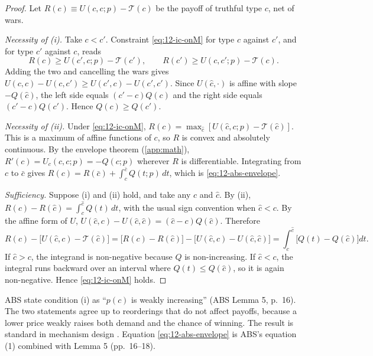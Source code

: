 \begin{proof}
Let $R(c) \equiv U(c, c; p) - \mathcal T(c)$ be the payoff of truthful type $c$, net of wars.

\emph{Necessity of (i).} Take $c < c'$. Constraint \eqref{eq:12-ic-onM} for type $c$ against $c'$, and for type $c'$
against $c$, reads
\begin{equation*}
R(c) \ge U(c', c; p) - \mathcal T(c'),
\qquad
R(c') \ge U(c, c'; p) - \mathcal T(c).
\end{equation*}
Adding the two and cancelling the wars gives $U(c, c) - U(c, c') \ge U(c', c) - U(c', c')$. Since $U(\hat c, \cdot)$ is
affine with slope $-Q(\hat c)$, the left side equals $(c' - c)Q(c)$ and the right side equals $(c' - c)Q(c')$. Hence
$Q(c) \ge Q(c')$.

\emph{Necessity of (ii).} Under \eqref{eq:12-ic-onM}, $R(c) = \max_{\hat c}[U(\hat c, c; p) - \mathcal T(\hat c)]$. This
is a maximum of affine functions of $c$, so $R$ is convex and absolutely continuous. By the envelope theorem
(\cref{app:math}), $R'(c) = U_c(c, c; p) = -Q(c; p)$ wherever $R$ is differentiable. Integrating from $c$ to $\bar c$
gives $R(c) = R(\bar c) + \int_c^{\bar c}Q(t; p)\,dt$, which is \eqref{eq:12-abs-envelope}.

\emph{Sufficiency.} Suppose (i) and (ii) hold, and take any $c$ and $\hat c$. By (ii),
$R(c) - R(\hat c) = \int_c^{\hat c}Q(t)\,dt$, with the usual sign convention when $\hat c < c$. By the affine form
of $U$, $U(\hat c, c) - U(\hat c, \hat c) = (\hat c - c)Q(\hat c)$. Therefore
\begin{equation*}
R(c) - \bigl[U(\hat c, c) - \mathcal T(\hat c)\bigr]
= \bigl[R(c) - R(\hat c)\bigr] - \bigl[U(\hat c, c) - U(\hat c, \hat c)\bigr]
= \int_c^{\hat c}\bigl[Q(t) - Q(\hat c)\bigr]dt .
\end{equation*}
If $\hat c > c$, the integrand is non-negative because $Q$ is non-increasing. If $\hat c < c$, the integral runs
backward over an interval where $Q(t) \le Q(\hat c)$, so it is again non-negative. Hence \eqref{eq:12-ic-onM} holds.
\end{proof}

ABS state condition (i) as ``$p(c)$ is weakly increasing'' (ABS Lemma 5, p.~16). The two statements agree up to
reorderings that do not affect payoffs, because a lower price weakly raises both demand and the chance of winning. The
result is standard in mechanism design \citep{FudenbergTirole1991}. Equation \eqref{eq:12-abs-envelope} is ABS's
equation (1) combined with Lemma 5 (pp.~16--18).

